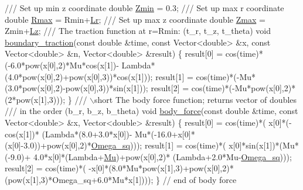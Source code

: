 \begin{DoxyCodeInclude}
\textcolor{comment}{}
\textcolor{comment}{ /// Set up min z coordinate}
\textcolor{comment}{} \textcolor{keywordtype}{double} \hyperlink{namespaceGlobal__Parameters_a1813b913bc85d4ce15ea68226ba6c63f}{Zmin} = 0.3;
\textcolor{comment}{}
\textcolor{comment}{ /// Set up max r coordinate}
\textcolor{comment}{} \textcolor{keywordtype}{double} \hyperlink{namespaceGlobal__Parameters_a06f5ea713550f61da323eafb91fceedd}{Rmax} = Rmin+\hyperlink{namespaceGlobal__Parameters_a444f5c911c8805ad2ba45ed8b1b8904e}{Lr};
\textcolor{comment}{}
\textcolor{comment}{ /// Set up max z coordinate}
\textcolor{comment}{} \textcolor{keywordtype}{double} \hyperlink{namespaceGlobal__Parameters_a36b7b169826f906d1d8d1a3aa4347d80}{Zmax} = Zmin+\hyperlink{namespaceGlobal__Parameters_a2bcf0bd846d839f1e3bb04a6c0a612c1}{Lz};
 \textcolor{comment}{}
\textcolor{comment}{ /// The traction function at r=Rmin: (t\_r, t\_z, t\_theta)}
\textcolor{comment}{} \textcolor{keywordtype}{void} \hyperlink{namespaceGlobal__Parameters_a61ef31c4db13380658f6d5ea47c3369d}{boundary\_traction}(\textcolor{keyword}{const} \textcolor{keywordtype}{double} &time,
                        \textcolor{keyword}{const} Vector<double> &x,
                        \textcolor{keyword}{const} Vector<double> &n,
                        Vector<double> &result)
 \{
  result[0] = cos(time)*(-6.0*pow(x[0],2)*Mu*cos(x[1])-
   Lambda*(4.0*pow(x[0],2)+pow(x[0],3))*cos(x[1]));
  result[1] = cos(time)*(-Mu*(3.0*pow(x[0],2)-pow(x[0],3))*sin(x[1]));
  result[2] = cos(time)*(-Mu*pow(x[0],2)*(2*pow(x[1],3)));
 \}
 \textcolor{comment}{}
\textcolor{comment}{ /// \(\backslash\)short The body force function; returns vector of doubles}
\textcolor{comment}{ /// in the order (b\_r, b\_z, b\_theta)}
\textcolor{comment}{} \textcolor{keywordtype}{void} \hyperlink{namespaceGlobal__Parameters_a6459755c5d38e277ceddbf317c4ed179}{body\_force}(\textcolor{keyword}{const} \textcolor{keywordtype}{double} &time,
                 \textcolor{keyword}{const} Vector<double> &x,
                 Vector<double> &result)
 \{
  result[0] = cos(time)*(
   x[0]*(-cos(x[1])*
         (Lambda*(8.0+3.0*x[0])-
          Mu*(-16.0+x[0]*(x[0]-3.0))+pow(x[0],2)*\hyperlink{namespaceGlobal__Parameters_af9e1e178dfb7f5e35b452599bd4c4324}{Omega\_sq})));
  result[1] = cos(time)*(
   x[0]*sin(x[1])*(Mu*(-9.0)+
                   4.0*x[0]*(Lambda+\hyperlink{namespaceGlobal__Parameters_a490d7680a7de63058a9c921e2705a103}{Mu})+pow(x[0],2)*
                   (Lambda+2.0*Mu-\hyperlink{namespaceGlobal__Parameters_af9e1e178dfb7f5e35b452599bd4c4324}{Omega\_sq})));
  result[2] = cos(time)*(
   -x[0]*(8.0*Mu*pow(x[1],3)+pow(x[0],2)*(pow(x[1],3)*Omega\_sq+6.0*Mu*x[1])));
 \} \textcolor{comment}{// end of body force}

\end{DoxyCodeInclude}


